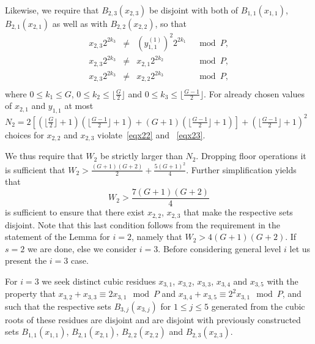 Likewise, we require that $B_{2,3}(x_{2,3})$ be disjoint with both
 of  $B_{1,1}(x_{1,1})$, $B_{2,1}(x_{2,1})$ as well as with
$B_{2,2}(x_{2,2})$, so that
\begin{equation}\label{eqx23}\begin{array}{cccc}
x_{2,3}2^{2k_3} &\neq& (y_{1,1}^{(1)})^2 2^{2k_1} &\mod P, \\
x_{2,3}2^{2k_3} &\neq& x_{2,1} 2^{2k_2} &\mod P, \\
x_{2,3}2^{2k_3} &\neq& x_{2,2} 2^{2k_3} &\mod P, \\
\end{array}\end{equation}
where $0 \leq k_1 \leq G$, $0 \leq k_2 \leq \lfloor \frac{G}{2}
\rfloor$ and $0 \leq k_3 \leq \lfloor\frac{G-1}{2} \rfloor$. For
already chosen values of $x_{2,1}$ and $y_{1,1}$ at most $N_2=
2\left[ \left(\lfloor \frac{G}{2} \rfloor +1 \right)\left(\lfloor
\frac{G-1}{2} \rfloor +1 \right)+ \left( G+1 \right)\left(\lfloor
\frac{G-1}{2} \rfloor +1 \right)\right]+\left( \lfloor
\frac{G-1}{2} \rfloor +1 \right)^2  $ choices for $x_{2,2}$ and
$x_{2,3}$ violate~\eqref{eqx22} and ~\eqref{eqx23}.

We thus require that $W_2$ be strictly larger than $N_2$. Dropping
floor operations it is sufficient that $W_2 > \frac{(G+1)(G+2)}{2}
+ \frac{5(G+1)^2}{4}$. Further  simplification yields that
\begin{equation}
W_2 > \frac{7(G+1)(G+2)}{4}
\end{equation}
is sufficient to ensure that there exist $x_{2,2}$, $x_{2,3}$ that
make the respective sets disjoint. Note that this last condition
follows from the requirement in the statement of the Lemma for
$i=2$, namely that $W_2 > 4(G+1)(G+2)$. If $s=2$ we are done, else
we consider $i=3$. Before considering general level $i$ let us
present the $i=3$ case.

For $i=3$ we seek distinct cubic residues $x_{3,1}$, $x_{3,2}$,
$x_{3,3}$, $x_{3,4}$ and $x_{3,5}$ with the property that
$x_{3,2}+ x_{3,3} \equiv 2x_{3,1} \mod P$ and $x_{3,4}+ x_{3,5}
\equiv 2^2x_{3,1} \mod P$, and such that the respective sets
$B_{3,j}(x_{3,j})$ for $1 \leq j \leq 5$ generated from the cubic
roots of these residues are disjoint and are disjoint with
previously constructed sets $B_{1,1}(x_{1,1})$,
$B_{2,1}(x_{2,1})$, $B_{2,2}(x_{2,2})$ and $B_{2,3}(x_{2,3})$.


